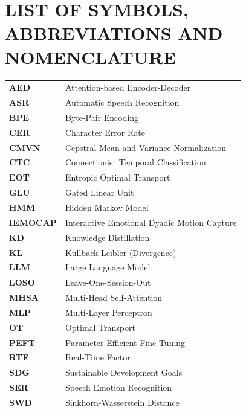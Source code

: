 \documentclass[12pt,a4paper]{report}
\begin{document}
\newpage
\tableofcontents

\newpage
\listoftables

\newpage
\listoffigures

\newpage
\chapter*{LIST OF SYMBOLS, ABBREVIATIONS AND NOMENCLATURE}

\begin{longtable}{p{2.5cm}p{12cm}}
\textbf{AED} & Attention-based Encoder-Decoder \\
\textbf{ASR} & Automatic Speech Recognition \\
\textbf{BPE} & Byte-Pair Encoding \\
\textbf{CER} & Character Error Rate \\
\textbf{CMVN} & Cepstral Mean and Variance Normalization \\
\textbf{CTC} & Connectionist Temporal Classification \\
\textbf{EOT} & Entropic Optimal Transport \\
\textbf{GLU} & Gated Linear Unit \\
\textbf{HMM} & Hidden Markov Model \\
\textbf{IEMOCAP} & Interactive Emotional Dyadic Motion Capture \\
\textbf{KD} & Knowledge Distillation \\
\textbf{KL} & Kullback-Leibler (Divergence) \\
\textbf{LLM} & Large Language Model \\
\textbf{LOSO} & Leave-One-Session-Out \\
\textbf{MHSA} & Multi-Head Self-Attention \\
\textbf{MLP} & Multi-Layer Perceptron \\
\textbf{OT} & Optimal Transport \\
\textbf{PEFT} & Parameter-Efficient Fine-Tuning \\
\textbf{RTF} & Real-Time Factor \\
\textbf{SDG} & Sustainable Development Goals \\
\textbf{SER} & Speech Emotion Recognition \\
\textbf{SWD} & Sinkhorn-Wasserstein Distance \\

\end{longtable}
\end{document}

